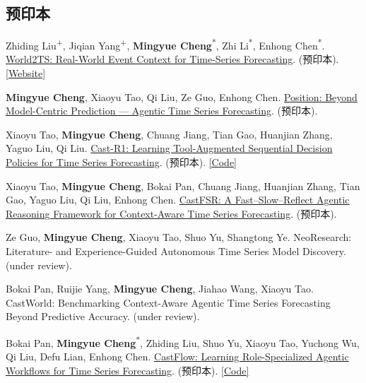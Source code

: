 \documentclass[UTF8,fontset=fandol,scheme=plain,11pt,a4paper]{ctexart}
\newcommand{\pubentry}[1]{\item \begin{minipage}[t]{\linewidth}#1\end{minipage}}
\begin{document}
\subsection{预印本}
\begin{publist}[start=69]
\pubentry{Zhiding Liu\textsuperscript{+}, Jiqian Yang\textsuperscript{+}, \textbf{Mingyue Cheng}\textsuperscript{*}, Zhi Li\textsuperscript{*}, Enhong Chen\textsuperscript{*}. \href{https://arxiv.org/abs/2610.14861}{World2TS: Real-World Event Context for Time-Series Forecasting}. (预印本). \href{https://world2ts.github.io/}{[Website]}}

\pubentry{\textbf{Mingyue Cheng}, Xiaoyu Tao, Qi Liu, Ze Guo, Enhong Chen. \href{https://arxiv.org/pdf/2602.01776.pdf}{Position: Beyond Model-Centric Prediction --- Agentic Time Series Forecasting}. (预印本).}

\pubentry{Xiaoyu Tao, \textbf{Mingyue Cheng}, Chuang Jiang, Tian Gao, Huanjian Zhang, Yaguo Liu, Qi Liu. \href{https://arxiv.org/pdf/2602.13802}{Cast-R1: Learning Tool-Augmented Sequential Decision Policies for Time Series Forecasting}. (预印本). \href{https://github.com/Xiaoyu-Tao/Cast-R1-TS}{[Code]}}

\pubentry{Xiaoyu Tao, \textbf{Mingyue Cheng}, Bokai Pan, Chuang Jiang, Huanjian Zhang, Tian Gao, Yaguo Liu, Qi Liu, Enhong Chen. \href{https://arxiv.org/abs/2608.03031}{CastFSR: A Fast--Slow--Reflect Agentic Reasoning Framework for Context-Aware Time Series Forecasting}. (预印本).}

\pubentry{Ze Guo, \textbf{Mingyue Cheng}, Xiaoyu Tao, Shuo Yu, Shangtong Ye. NeoResearch: Literature- and Experience-Guided Autonomous Time Series Model Discovery. (under review).}

\pubentry{Bokai Pan, Ruijie Yang, \textbf{Mingyue Cheng}, Jiahao Wang, Xiaoyu Tao. CastWorld: Benchmarking Context-Aware Agentic Time Series Forecasting Beyond Predictive Accuracy. (under review).}

\pubentry{Bokai Pan, \textbf{Mingyue Cheng}\textsuperscript{*}, Zhiding Liu, Shuo Yu, Xiaoyu Tao, Yuchong Wu, Qi Liu, Defu Lian, Enhong Chen. \href{https://arxiv.org/pdf/2604.27840}{CastFlow: Learning Role-Specialized Agentic Workflows for Time Series Forecasting}. (预印本). \href{https://github.com/Forever-Pan/CastFlow}{[Code]}}


\end{publist}
\end{document}
